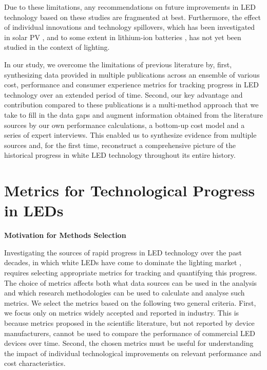 \documentclass[parskip=full]{article}
\begin{document}
Due to these limitations, any recommendations on future improvements in LED technology based on these studies are fragmented at best. Furthermore, the effect of individual innovations and technology spillovers, which has been investigated in solar PV \cite{kavlak2018evaluating,kolesnikov2021spillovers,nemet2019solar}, and to some extent in lithium-ion batteries \cite{Stephan2021}, has not yet been studied in the context of lighting.

In our study, we overcome the limitations of previous literature by, first, synthesizing data provided in multiple publications across an ensemble of various cost, performance and consumer experience metrics for tracking progress in LED technology over an extended period of time. Second, our key advantage and contribution compared to these publications is a multi-method approach that we take to fill in the data gaps and augment information obtained from the literature sources by our own performance calculations, a bottom-up cost model and a series of expert interviews. This enabled us to synthesize evidence from multiple sources and, for the first time, reconstruct a comprehensive picture of the historical progress in white LED technology throughout its entire history.

\clearpage
\section{Metrics for Technological Progress in LEDs}

\textbf{Motivation for Methods Selection}

Investigating the sources of rapid progress in LED technology over the past decades, in which white LEDs have come to dominate the lighting market \cite{zissis2021}, requires selecting appropriate metrics for tracking and quantifying this progress. The choice of metrics affects both what data sources can be used in the analysis and which research methodologies can be used to calculate and analyse such metrics. We select the metrics based on the following two general criteria. First, we focus only on metrics widely accepted and reported in industry. This is because metrics proposed in the scientific literature, but not reported by device manufacturers, cannot be used to compare the performance of commercial LED devices over time. Second, the chosen metrics must be useful for understanding the impact of individual technological improvements on relevant performance and cost characteristics.
\end{document}
